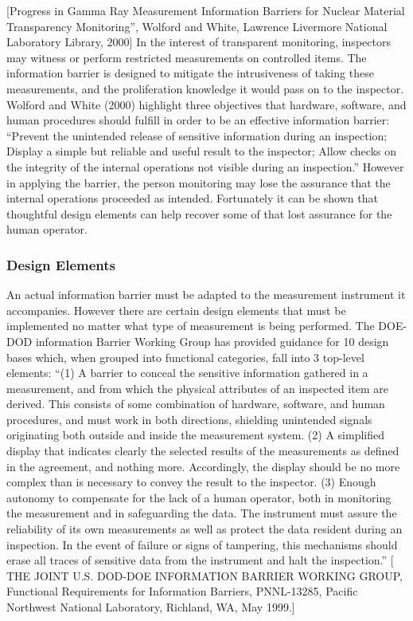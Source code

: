 \documentclass[twocolumn,a4paper]{article}
\begin{document}
[Progress in Gamma Ray Measurement Information Barriers for Nuclear Material 
Transparency Monitoring'', Wolford and White, Lawrence Livermore National 
Laboratory Library, 2000]
In the interest of transparent monitoring, inspectors may witness or perform 
restricted measurements on controlled items. The information barrier is designed 
to mitigate the intrusiveness of taking these measurements, and the proliferation 
knowledge it would pass on to the inspector. Wolford and White (2000) highlight 
three objectives that hardware, software, and human procedures should fulfill in 
order to be an effective information barrier:
``Prevent the unintended release of sensitive information during an inspection;
Display a simple but reliable and useful result to the inspector;
Allow checks on the integrity of the internal operations not visible during an inspection.''
However in applying the barrier, the person monitoring may lose the assurance 
that the internal operations proceeded as intended. Fortunately it can be shown 
that thoughtful design elements can help recover some of that lost assurance for 
the human operator.

\subsubsection{Design Elements}
An actual information barrier must be adapted to the measurement instrument it 
accompanies. However there are certain design elements that must be implemented 
no matter what type of measurement is being performed. The DOE-DOD information 
Barrier Working Group has provided guidance for 10 design bases which, when 
grouped into functional categories, fall into 3 top-level elements:
``(1) A barrier to conceal the sensitive information gathered in a measurement, 
and from which the physical attributes of an inspected item are derived. This 
consists of some combination of hardware, software, and human procedures, and 
must work in both directions, shielding unintended signals originating both 
outside and inside the measurement system.
(2) A simplified display that indicates clearly the selected results of the 
measurements as defined in the agreement, and nothing more. Accordingly, the 
display should be no more complex than is necessary to convey the result to the 
inspector.
(3) Enough autonomy to compensate for the lack of a human operator, both in 
monitoring the measurement and in safeguarding the data. The instrument must 
assure the reliability of its own measurements as well as protect the data 
resident during an inspection. In the event of failure or signs of tampering, 
this mechanisms should erase all traces of sensitive data from the instrument 
and halt the inspection.''
[ THE JOINT U.S. DOD-DOE INFORMATION BARRIER WORKING GROUP, Functional 
Requirements for Information Barriers, PNNL-13285, Pacific Northwest National 
Laboratory, Richland, WA, May 1999.]
\end{document}
